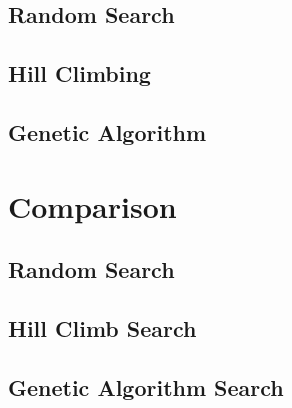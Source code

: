 \documentclass[11pt, a4paper]{article}
\begin{document}
\subsection{Random Search}

\subsection{Hill Climbing}

\subsection{Genetic Algorithm}

\section{Comparison}
\subsection{Random Search}
\subsection{Hill Climb Search}
\subsection{Genetic Algorithm Search}


 
\end{document}
